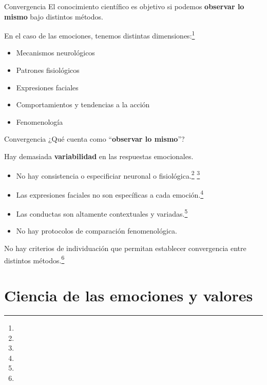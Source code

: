 \documentclass[%
            9pt,
                spanish, %
                    ignorenonframetext,
                    handout, %
                aspectratio=169, %
        ]{beamer}
\providecommand{\tightlist}{}
\begin{document}
\begin{frame}{Convergencia}
\label{convergencia}
El conocimiento científico es objetivo si podemos \textbf{observar lo
mismo} bajo distintos métodos.

\pause

En el caso de las emociones, tenemos distintas
dimensiones:\footnote[frame]{}

\pause

\begin{itemize}
\tightlist
\item
  Mecanismos neurológicos \pause
\item
  Patrones fisiológicos \pause
\item
  Expresiones faciales \pause
\item
  Comportamientos y tendencias a la acción \pause
\item
  Fenomenología
\end{itemize}
\end{frame}

\begin{frame}{Convergencia}
\label{convergencia-1}
¿Qué cuenta como ``\textbf{observar lo mismo}''?

\pause

Hay demasiada \textbf{variabilidad} en las respuestas emocionales.

\pause

\begin{itemize}
\tightlist
\item
  No hay consistencia o especificiar neuronal o
  fisiológica.\footnote[frame]{} \footnote[frame]{}
  \pause
\item
  Las expresiones faciales no son específicas a cada
  emoción.\footnote[frame]{} \pause
\item
  Las conductas son altamente contextuales y
  variadas.\footnote[frame]{} \pause
\item
  No hay protocolos de comparación fenomenológica.
\end{itemize}

\pause

No hay criterios de individuación que permitan establecer convergencia
entre distintos métodos.\footnote[frame]{}
\end{frame}

\section{Ciencia de las emociones y
valores}\label{ciencia-de-las-emociones-y-valores}
\end{document}
